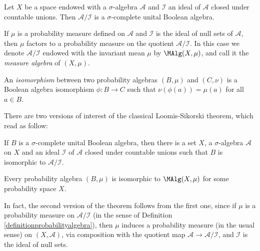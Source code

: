 \begin{example}
Let $X$ be a space endowed with a $\sigma$-algebra $\mathcal{A}$ and $\mathcal{I}$ an ideal of $\mathcal{A}$ closed under countable unions. Then $\mathcal{A}/\mathcal{I}$ is a $\sigma$-complete unital Boolean algebra.

If $\mu$ is a probability measure defined on $\mathcal{A}$ and $\mathcal{I}$ is the ideal of null sets of $\mathcal{A}$, then $\mu$ factors to a probability measure on the quotient $\mathcal{A}/\mathcal{I}$. In this case we denote $\mathcal{A}/\mathcal{I}$ endowed with the invariant mean $\mu$ by $\MAlg(X,\mu)$, and call it the \emph{measure algebra} of $(X,\mu)$.
\end{example}

\begin{definition}
An \emph{isomorphism} between two probability algebras $(B,\mu)$ and $(C,\nu)$ is a Boolean algebra isomorphism $\phi:B\to C$ such that $\nu(\phi(a))=\mu(a)$ for all $a\in B$.
\end{definition}

There are two versions of interest of the classical Loomis-Sikorski theorem, which read as follow:

\begin{theorem}[\cite{MR0021084}]
If $B$ is a $\sigma$-complete unital Boolean algebra, then there is a set $X$, a $\sigma$-algebra $\mathcal{A}$ on $X$ and an ideal $\mathcal{I}$ of $\mathcal{A}$ closed under countable unions such that $B$ is isomorphic to $\mathcal{A}/\mathcal{I}$.
\end{theorem}

\begin{theorem}[\cite{MR0017736}]
Every probability algebra $(B,\mu)$ is isomorphic to $\MAlg(X,\mu)$ for some probability space $X$.
\end{theorem}

In fact, the second version of the theorem follows from the first one, since if $\mu$ is a probability measure on $\mathcal{A}/\mathcal{I}$ (in the sense of Definition \ref{definitionprobabilityalgebra}), then $\mu$ induces a probability measure (in the usual sense) on $(X,\mathcal{A})$, via composition with the quotient map $\mathcal{A}\to\mathcal{A}/\mathcal{I}$, and $\mathcal{I}$ is the ideal of null sets.


